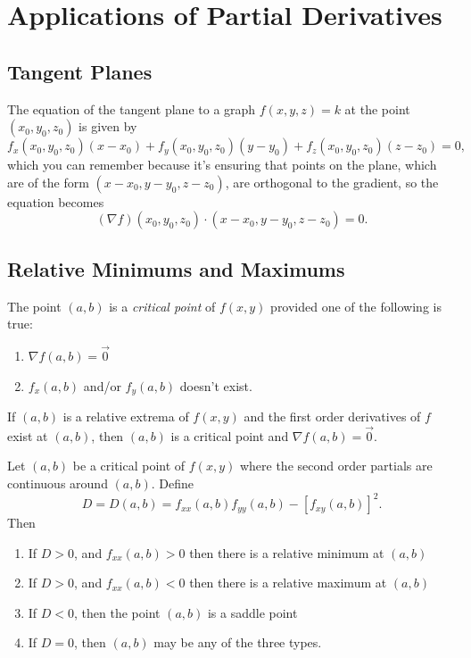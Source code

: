 \documentclass[12pt]{article}
\theoremstyle{definition}
\begin{document}
\section{Applications of Partial Derivatives}

\subsection{Tangent Planes}
The equation of the tangent plane to a graph $f(x, y, z) = k$ at the point $(x_0, y_0, z_0)$ is given by \begin{equation*}
	f_x(x_0, y_0, z_0)(x-x_0) + f_y(x_0, y_0, z_0)(y-y_0) + f_z(x_0, y_0, z_0)(z-z_0)  = 0,
\end{equation*}
which you can remember because it's ensuring that points on the plane, which are of the form $(x-x_0, y-y_0, z-z_0)$, are orthogonal to the gradient, so the equation becomes \begin{equation*}
	(\nabla f)(x_0,y_0,z_0) \cdot (x-x_0, y-y_0, z-z_0) = 0.
\end{equation*}

\subsection{Relative Minimums and Maximums}
The point $(a, b)$ is a \textit{critical point} of $f(x, y)$ provided one of the following is true: \begin{enumerate}
	\item $\nabla f(a,b) =\vec{0}$
	\item $f_x(a,b)$ and/or $f_y(a, b)$ doesn't exist.
\end{enumerate}
If $(a, b)$ is a relative extrema of $f(x, y)$ and the first order derivatives of $f$ exist at $(a, b)$, then $(a, b)$ is a critical point and $\nabla f (a, b) = \vec{0}$.

Let $(a, b)$ be a critical point of $f(x, y)$ where the second order partials are continuous around $(a, b)$.
Define \begin{equation*}
	D = D(a, b) = f_{xx}(a, b)f_{yy}(a, b) - \left[f_{xy}(a,b)\right]^2.
\end{equation*}
Then \begin{enumerate}
	\item If $D > 0$, and $f_{xx}(a,b)>0$ then there is a relative minimum at $(a, b)$
	\item If $D > 0$, and $f_{xx}(a,b)<0$ then there is a relative maximum at $(a, b)$
	\item If $D<0$, then the point $(a, b)$ is a saddle point
	\item If $D = 0$, then $(a, b)$ may be any of the three types.
\end{enumerate}
\end{document}

